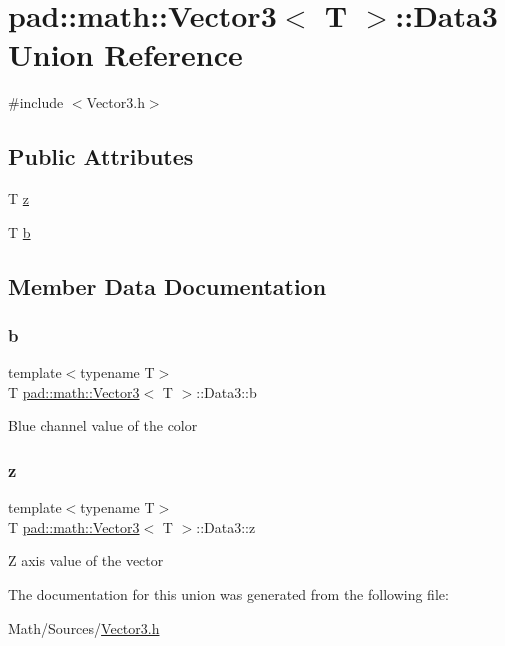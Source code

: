 \hypertarget{unionpad_1_1math_1_1_vector3_1_1_data3}{}\section{pad\+:\+:math\+:\+:Vector3$<$ T $>$\+:\+:Data3 Union Reference}
\label{unionpad_1_1math_1_1_vector3_1_1_data3}


{\ttfamily \#include $<$Vector3.\+h$>$}

\subsection*{Public Attributes}
\begin{DoxyCompactItemize}
\item 
T \mbox{\hyperlink{unionpad_1_1math_1_1_vector3_1_1_data3_a27b7fcc955a0a59b35330bbe23a0f297}{z}}
\item 
T \mbox{\hyperlink{unionpad_1_1math_1_1_vector3_1_1_data3_a97302d38cea326d2cf4ec221d3138fb2}{b}}
\end{DoxyCompactItemize}


\subsection{Member Data Documentation}
\mbox{\label{unionpad_1_1math_1_1_vector3_1_1_data3_a97302d38cea326d2cf4ec221d3138fb2}} 
\subsubsection{\texorpdfstring{b}{b}}
{\footnotesize\ttfamily template$<$typename T$>$ \\
T \mbox{\hyperlink{structpad_1_1math_1_1_vector3}{pad\+::math\+::\+Vector3}}$<$ T $>$\+::Data3\+::b}

Blue channel value of the color \mbox{\label{unionpad_1_1math_1_1_vector3_1_1_data3_a27b7fcc955a0a59b35330bbe23a0f297}} 
\subsubsection{\texorpdfstring{z}{z}}
{\footnotesize\ttfamily template$<$typename T$>$ \\
T \mbox{\hyperlink{structpad_1_1math_1_1_vector3}{pad\+::math\+::\+Vector3}}$<$ T $>$\+::Data3\+::z}

Z axis value of the vector 

The documentation for this union was generated from the following file\+:\begin{DoxyCompactItemize}
\item 
Math/\+Sources/\mbox{\hyperlink{_vector3_8h}{Vector3.\+h}}\end{DoxyCompactItemize}
